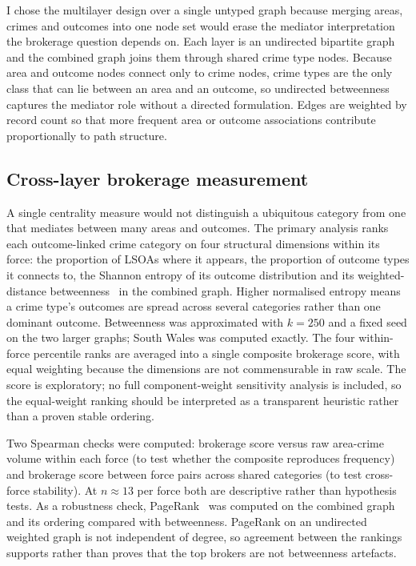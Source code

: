 \documentclass[conference,a4paper]{IEEEtran}
\begin{document}
I chose the multilayer design over a single untyped graph because
merging areas, crimes and outcomes into one node set would erase the
mediator interpretation the brokerage question depends on.
Each layer is an undirected bipartite graph and the combined graph
joins them through shared crime type nodes.
Because area and outcome nodes connect only to crime nodes, crime
types are the only class that can lie between an area and an outcome,
so undirected betweenness captures the mediator role without a
directed formulation.
Edges are weighted by record count so that more frequent area or
outcome associations contribute proportionally to path structure.

\subsection{Cross-layer brokerage measurement}

A single centrality measure would not distinguish a ubiquitous
category from one that mediates between many areas and outcomes.
The primary analysis ranks each outcome-linked crime category on four
structural dimensions within its force: the proportion of LSOAs where
it appears, the proportion of outcome types it connects to, the Shannon
entropy of its outcome distribution and its weighted-distance
betweenness~\cite{brandes2001betweenness} in the combined graph.
Higher normalised entropy means a crime type's outcomes are
spread across several categories rather than one dominant
outcome.
Betweenness was approximated with $k{=}250$ and a fixed seed on the two
larger graphs; South Wales was computed exactly.
The four within-force percentile ranks are averaged into a single
composite brokerage score, with equal weighting because the dimensions
are not commensurable in raw scale.
The score is exploratory; no full component-weight sensitivity
analysis is included, so the equal-weight ranking should be
interpreted as a transparent heuristic rather than a proven stable
ordering.

Two Spearman checks were computed: brokerage score versus raw
area-crime volume within each force (to test whether the composite
reproduces frequency) and brokerage score between force pairs across
shared categories (to test cross-force stability).
At $n{\approx}13$ per force both are descriptive rather than
hypothesis tests.
As a robustness check, PageRank~\cite{newman2010networks} was computed
on the combined graph and its ordering compared with betweenness.
PageRank on an undirected weighted graph is not independent of
degree, so agreement between the rankings supports rather than proves
that the top brokers are not betweenness artefacts.
\end{document}
